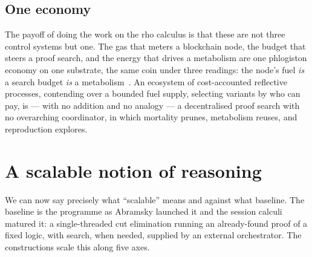 \documentclass[11pt]{article}
\theoremstyle{definition}
\theoremstyle{plain}
\begin{document}
\subsection{One economy}

The payoff of doing the work on the rho calculus is that these are not three
control systems but one. The gas that meters a blockchain node, the budget that
steers a proof search, and the energy that drives a metabolism are one
phlogiston economy on one substrate, the same coin under three readings: the
node's fuel \emph{is} a search budget \emph{is} a metabolism~\cite{NoteIV}. An
ecosystem of cost-accounted reflective processes, contending over a bounded fuel
supply, selecting variants by who can pay, is --- with no addition and no
analogy --- a decentralised proof search with no overarching coordinator, in
which mortality prunes, metabolism reuses, and reproduction explores.

\section{A scalable notion of reasoning}\label{sec:scalable}

We can now say precisely what ``scalable'' means and against what baseline. The
baseline is the programme as Abramsky launched it and the session calculi
matured it: a single-threaded cut elimination running an already-found proof of
a fixed logic, with search, when needed, supplied by an external orchestrator.
The constructions scale this along five axes.
\end{document}
